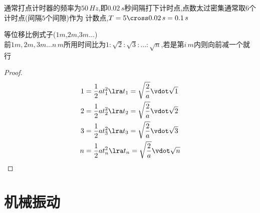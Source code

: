 \documentclass{article}
\begin{document}
通常打点计时器的频率为$50 \, Hz$,即$0.02 \,s $秒间隔打下计时点,点数太过密集通常取$6$个计时点(间隔$5$个间隙)作为
计数点,$T = 5 \cross 0.02 \,s = 0.1 \, s$

\vspace{2em}

\begin{corollary*}
    等位移比例式子($1m$,$2m$,$3m \dots$)    \\
    前$1m,2m,3m \dots n \, m$所用时间比为$1:\sqrt{2}:\sqrt{3}:\dots:\sqrt{n}$,若是第$i\,m$内则向前减一个就行
    \begin{proof}
        \begin{align*}
            1 & = \frac{1}{2}a t_{1}^{2} \lra t_{1} =\sqrt{\frac{2}{a}} \vdot \sqrt{1} \\
            2 & = \frac{1}{2}a t_{2}^{2} \lra t_{2} =\sqrt{\frac{2}{a}} \vdot \sqrt{2} \\
            3 & = \frac{1}{2}a t_{3}^{2} \lra t_{3} =\sqrt{\frac{2}{a}} \vdot \sqrt{3} \\
            n & = \frac{1}{2}a t_{n}^{2} \lra t_{n} =\sqrt{\frac{2}{a}} \vdot \sqrt{n} \\
        \end{align*}
    \end{proof}
\end{corollary*}

\vspace{2em}

\newpage

\section{机械振动}
\end{document}

